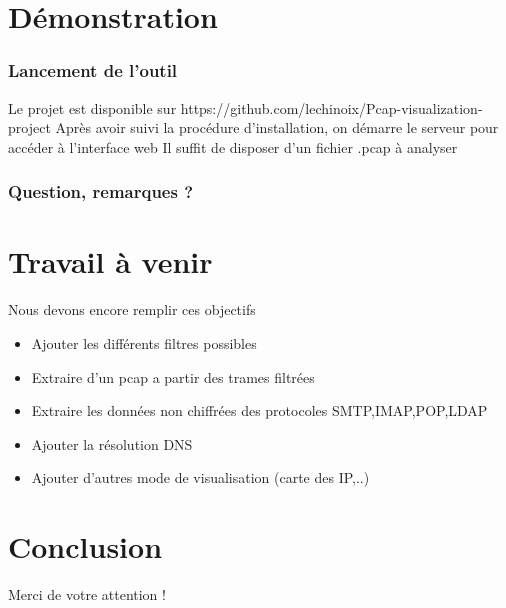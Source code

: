 \documentclass{beamer}
\begin{document}
 \section{Démonstration}
  \begin{frame}
    \frametitle{Lancement de l'outil}
    Le projet est disponible sur https://github.com/lechinoix/Pcap-visualization-project
    Après avoir suivi la procédure d'installation, on démarre le serveur pour accéder à l'interface web
    Il suffit de disposer d'un fichier .pcap à analyser
  \end{frame}


  \begin{frame}
    \frametitle{Question, remarques ?}
  \end{frame}

  \section{Travail à venir}
  \begin{frame}
    Nous devons encore remplir ces objectifs
    \begin{itemize}
     \item Ajouter les différents filtres possibles
     \item Extraire d'un pcap a partir des trames filtrées
     \item Extraire les données non chiffrées des protocoles SMTP,IMAP,POP,LDAP
     \item Ajouter la résolution DNS
     \item Ajouter d'autres mode de visualisation (carte des IP,..)
    \end{itemize}
  \end{frame}


  \section{Conclusion}
  \begin{frame}
    \begin{center}
      Merci de votre attention !
    \end{center}
  \end{frame}
\end{document}
